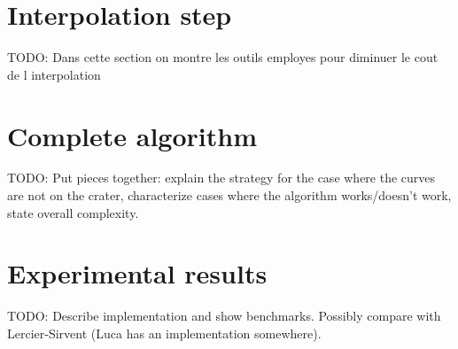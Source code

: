 \documentclass{article}
\newcommand{\todo}[1]{{\color{red}TODO: #1}}
\theoremstyle{plain}
\theoremstyle{definition}
\theoremstyle{remark}
\begin{document}

\section{Interpolation step}
\label{sec:interpolation}
\todo{Dans cette section on montre les outils employes pour diminuer le cout de l interpolation}


\section{Complete algorithm}
\label{sec:complete-algorithm}
\todo{Put pieces together: explain the strategy for the case where the
  curves are not on the crater, characterize cases where the algorithm
  works/doesn't work, state overall complexity.}


\section{Experimental results}
\label{sec:implem}

\todo{Describe implementation and show benchmarks. Possibly compare
  with Lercier-Sirvent (Luca has an implementation somewhere).}



\end{document}
